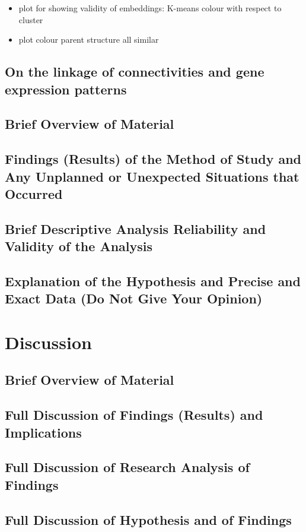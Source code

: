 \documentclass[]{article}
\begin{document}
\begin{itemize}
	\item plot for showing validity of embeddings: K-means colour with respect to cluster 
	\item plot colour parent structure all similar
\end{itemize}

\subsection{On the linkage of connectivities and gene expression patterns}

\subsection*{Brief Overview of Material}
\subsection*{Findings (Results) of the Method of Study and Any Unplanned or Unexpected Situations that Occurred}
\subsection*{Brief Descriptive Analysis
Reliability and Validity of the Analysis}
\subsection*{Explanation of the Hypothesis and Precise and Exact Data (Do Not Give Your Opinion)}


\newpage
\section{Discussion}
\label{sec:discussion}
\subsection*{Brief Overview of Material}
\subsection*{Full Discussion of Findings (Results) and Implications}
\subsection*{Full Discussion of Research Analysis of Findings}
\subsection*{Full Discussion of Hypothesis and of Findings}
\end{document}
